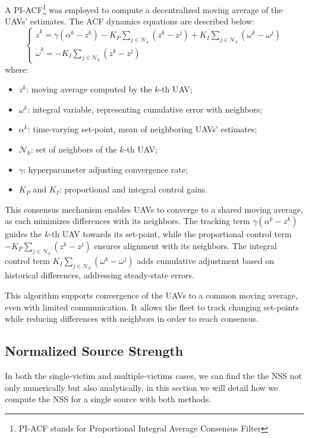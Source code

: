 A PI-ACF\footnote{PI-ACF stands for Proportional Integral Average Consensus Filter} was employed to compute 
a decentralized moving average of the UAVs' estimates. 
The ACF dynamics equations are described below:
\[
\begin{cases}
    \dot{z}^k = \gamma(\alpha^k - z^k) - K_P \sum_{j \in \mathcal{N}_k} (z^k - z^j) + K_I \sum_{j \in \mathcal{N}_k} (\omega^k - \omega^j) \\
    \dot{\omega}^k = - K_I \sum_{j \in \mathcal{N}_k} (z^k - z^j)
\end{cases}
\]
where:
\begin{itemize}
    \item \( z^k \): moving average computed by the \( k \)-th UAV;
    \item \( \omega^k \): integral variable, representing cumulative error 
    with neighbors;
    \item \( \alpha^k \): time-varying set-point, mean of neighboring UAVs' estimates;
    \item \( \mathcal{N}_k \): set of neighbors of the \( k \)-th UAV;
    \item \( \gamma \): hyperparameter adjusting convergence rate;
    \item \( K_P \) and \( K_I \): proportional and integral control gains.
\end{itemize}
This consensus mechanism enables UAVs to converge to a shared moving average, 
as each minimizes differences with its neighbors. The tracking term \( \gamma(\alpha^k - z^k) \) 
guides the \( k \)-th UAV towards its set-point, while the proportional control term 
\( -K_P \sum_{j \in \mathcal{N}_k} (z^k - z^j) \) ensures alignment with its neighbors. 
The integral control term \( K_I \sum_{j \in \mathcal{N}_k} (\omega^k - \omega^j) \) 
adds cumulative adjustment based on historical differences, addressing steady-state errors.

This algorithm supports convergence of the UAVs to a common moving average, even with 
limited communication. It allows the fleet to track changing set-points while 
reducing differences with neighbors in order to reach consensus.

\subsection{Normalized Source Strength}
In both the single-victim and multiple-victims cases, we can find the the NSS not only numerically but also
analytically, in this section we will detail how we compute the NSS for a single source with both methods.

